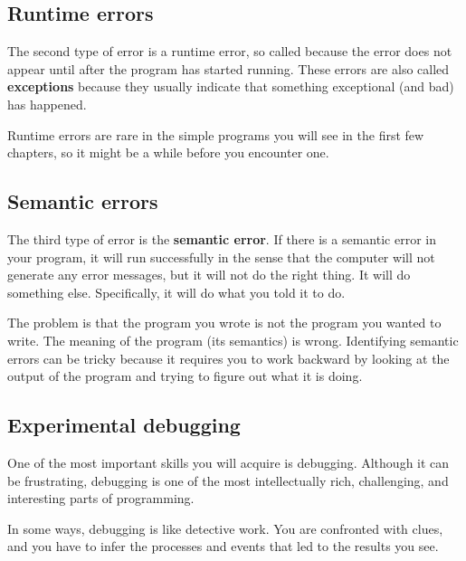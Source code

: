 \documentclass[10pt]{book}
\begin{document}
\subsection{Runtime errors}
\label{runtime}

The second type of error is a runtime error, so called because the
error does not appear until after the program has started running.
These errors are also called {\bf exceptions} because they usually
indicate that something exceptional (and bad) has happened.

Runtime errors are rare in the simple programs you will see in the
first few chapters, so it might be a while before you encounter one.


\subsection{Semantic errors}

The third type of error is the {\bf semantic error}.  If there is a
semantic error in your program, it will run successfully in the sense
that the computer will not generate any error messages, but it will
not do the right thing.  It will do something else.  Specifically, it
will do what you told it to do.

The problem is that the program you wrote is not the program you
wanted to write.  The meaning of the program (its semantics) is wrong.
Identifying semantic errors can be tricky because it requires you to work
backward by looking at the output of the program and trying to figure
out what it is doing.

\subsection{Experimental debugging}

One of the most important skills you will acquire is debugging.
Although it can be frustrating, debugging is one of the most
intellectually rich, challenging, and interesting parts of
programming.


In some ways, debugging is like detective work.  You are confronted
with clues, and you have to infer the processes and events that led
to the results you see.
\end{document}
